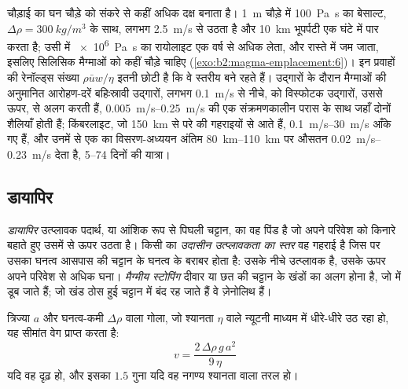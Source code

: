 चौड़ाई का घन चौड़े  को संकरे  से कहीं अधिक दक्ष बनाता है।
\qty{1}{m} चौड़े  में \qty{100}{Pa.s} का बेसाल्ट, $\Delta\rho =
\qty{300}{kg/m^3}$ के साथ, लगभग \qty{2.5}{m/s} से उठता है और \qty{10}{km}
भूपर्पटी एक घंटे में पार करता है; उसी  में \qty{e6}{Pa.s} का रायोलाइट एक वर्ष से
अधिक लेता, और रास्ते में जम जाता, इसलिए सिलिसिक मैग्माओं को कहीं चौड़े
 चाहिए (\cref{exo:b2:magma-emplacement:6})। इन प्रवाहों की रेनॉल्ड्स संख्या $\rho\bar u w/\eta$
इतनी छोटी है कि वे स्तरीय बने रहते हैं। उद्गारों के दौरान मैग्माओं की अनुमानित
आरोहण-दरें बहिःस्रावी उद्गारों, लगभग \qty{0.1}{m/s} से नीचे, को
विस्फोटक उद्गारों, उससे ऊपर, से अलग करती हैं, \qtyrange{0.005}{0.25}{m/s} की एक संक्रमणकालीन परास के साथ
जहाँ दोनों शैलियाँ होती हैं; किंबरलाइट, जो \qty{150}{km} से परे की
गहराइयों से आते हैं, \qtyrange{0.1}{30}{m/s} आँके गए हैं, और
उनमें से एक का विसरण-अध्ययन अंतिम \qtyrange{80}{110}{km} पर औसतन \qtyrange{0.02}{0.23}{m/s}
देता है, \numrange{5}{74} दिनों की यात्रा।

\subsection{डायापिर}

\begin{definition}[डायापिर, उदासीन उत्प्लावकता का स्तर, स्टोपिंग]\label{def:b2:magma-emplacement:ascent}
\emph{डायापिर} उत्प्लावक पदार्थ,  या आंशिक रूप से पिघली
चट्टान, का वह पिंड है जो अपने परिवेश को किनारे बहाते हुए उसमें से ऊपर उठता है। किसी  का
\emph{उदासीन उत्प्लावकता का स्तर} वह
गहराई है जिस पर उसका घनत्व आसपास की चट्टान के घनत्व के बराबर होता है: उसके नीचे
 उत्प्लावक है, उसके ऊपर अपने परिवेश से अधिक घना। \emph{मैग्मीय
स्टोपिंग} दीवार या छत की चट्टान के खंडों का अलग होना है,
जो  में डूब जाते हैं; जो खंड ठोस हुई चट्टान में बंद रह जाते हैं
वे ज़ेनोलिथ हैं।
\end{definition}

\begin{proposition}[स्टोक्स आरोहण]\label{prop:b2:magma-emplacement:stokes}
त्रिज्या $a$ और घनत्व-कमी $\Delta\rho$ वाला गोला, जो श्यानता $\eta$ वाले
न्यूटनी माध्यम में धीरे-धीरे उठ रहा हो, यह सीमांत वेग प्राप्त करता है:
\[
v = \frac{2\,\Delta\rho\,g\,a^2}{9\,\eta}
\]
यदि वह दृढ़ हो, और इसका $1.5$ गुना यदि वह नगण्य श्यानता वाला तरल हो।
\end{proposition}
\admitted


